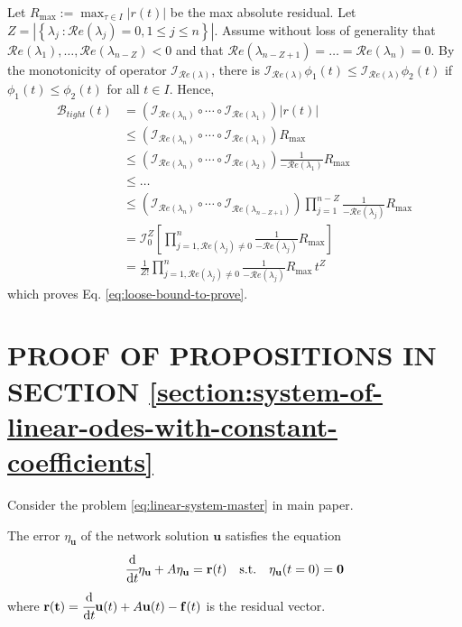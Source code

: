 \documentclass[accepted]{uai2023}
\newcommand{\vect}[1]{\mathbf{#1}}
\newcommand{\dt}[1]{\cfrac{\mathrm{d} #1}{\mathrm{d} t}}
\newcommand{\Err}{\eta}
\newcommand{\Bound}{\mathcal{B}}
\newcommand{\I}{\mathcal{I}}
\renewcommand{\Re}[1]{\mathcal{R}e\left(#1\right)}
\begin{document}
Let $\displaystyle R_{\max} := \max_{\tau\in I} |r(t)|$ be the max absolute residual.
Let $Z = |\left\{\lambda_j\ :\Re{\lambda_j} =0,1 \leq j \leq n\right\}|$. 
Assume without loss of generality that $\Re{\lambda_1}, \dots, \Re{\lambda_{n-Z}} < 0$ and that $\Re{\lambda_{n-Z+1}} = \dots = \Re{\lambda_n} = 0$.
By the monotonicity of operator $\I_{\Re{\lambda}}$, there is $\I_{\Re{\lambda}} \phi_1(t) \leq \I_{\Re{\lambda}} \phi_2(t)$ if $\phi_1(t) \leq \phi_2(t)$ for all $t \in I$. Hence, 
\begin{align}
    \Bound_{tight}(t) &= \left(\I_{\Re{\lambda_n}}\circ \cdots \circ\I_{\Re{\lambda_{1}}}\right)\left|r(t)\right| \\
    &\leq \left(\I_{\Re{\lambda_n}}\circ \cdots \circ\I_{\Re{\lambda_{1}}}\right) R_{\max}\\
    &\leq \left(\I_{\Re{\lambda_n}}\circ \cdots \circ\I_{\Re{\lambda_{2}}}\right) \frac{1}{-\Re{\lambda_1}}R_{\max}\\
    &\leq \dots \nonumber \\
    &\leq \left(\I_{\Re{\lambda_n}}\circ \cdots \circ\I_{\Re{\lambda_{n-Z+1}}}\right) \prod_{j=1}^{n-Z}\frac{1}{-\Re{\lambda_j}}R_{\max}\\
    &= \I_0^Z \left[\prod_{j=1, \Re{\lambda_j}\neq 0}^{n}\frac{1}{-\Re{\lambda_j}}R_{\max}\right]\\
    &= \frac{1}{Z!} \prod_{j=1, \Re{\lambda_j}\neq 0}^{n}\frac{1}{-\Re{\lambda_j}}R_{\max}\, t^Z
\end{align}
which proves Eq. \ref{eq:loose-bound-to-prove}.

\section{PROOF OF PROPOSITIONS IN SECTION \ref{section:system-of-linear-odes-with-constant-coefficients}}
    Consider the problem \ref{eq:linear-system-master} in main paper. 

    The error $\Err_{\vect{u}}$ of the network solution $\vect{u}$ satisfies the equation
    \begin{equation}\label{eq:system-err-equation}
        \dt{}\Err_{\vect{u}} + A\Err_{\vect{u}} = \vect{r}(t) \quad \text{s.t.} \quad \Err_\vect{u}(t=0) = \vect{0}
    \end{equation}
    where $\vect{r(t)} = \dt{}\vect{u}(t) + A\vect{u}(t) - \vect{f}(t)$ is the residual vector.
\end{document}
